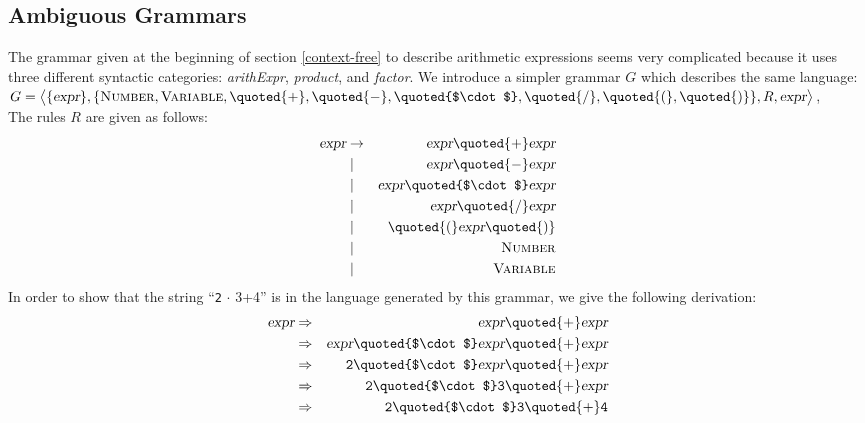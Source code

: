 \subsection{Ambiguous Grammars}
The grammar given at the beginning of section \ref{context-free} to describe arithmetic
expressions seems very complicated because it uses three different syntactic categories: \textsl{arithExpr},
\textsl{product}, and \textsl{factor}.  We introduce a simpler grammar $G$
which describes the same language:
\\[0.2cm]
\hspace*{1.3cm}
$G = \bigl\langle \{\textsl{expr}\}, \{ \textsc{Number}, \textsc{Variable}, \quoted{+}, \quoted{-}, \quoted{$\cdot$}, \quoted{/}, \quoted{(}, \quoted{)} \}, R, \textsl{expr} \bigr\rangle$,
\\[0.2cm]
The rules $R$ are given as follows:
\begin{eqnarray*}
  \textsl{expr} & \rightarrow & \textsl{expr} \quoted{+} \textsl{expr}  \\
                & \mid & \textsl{expr} \quoted{-} \textsl{expr}  \\
                & \mid & \textsl{expr} \quoted{$\cdot$} \textsl{expr}  \\
                & \mid & \textsl{expr} \quoted{/} \textsl{expr}  \\
                & \mid & \quoted{(} \textsl{expr} \quoted{)}     \\
                & \mid & \textsc{Number}                         \\
                & \mid & \textsc{Variable}                         
\end{eqnarray*}
In order to show that the string ``\texttt{2}$\,\cdot\,${3+4}'' is in the language generated by this grammar,
we give the following derivation:
\begin{eqnarray*}
\textsl{expr} & \Rightarrow & \textsl{expr} \quoted{+} \textsl{expr}                           \\
              & \Rightarrow & \textsl{expr} \quoted{$\cdot$} \textsl{expr} \quoted{+} \textsl{expr}  \\
              & \Rightarrow & \texttt{2} \quoted{$\cdot$} \textsl{expr} \quoted{+} \textsl{expr}     \\
              & \Rightarrow & \texttt{2} \quoted{$\cdot$} \texttt{3} \quoted{+} \textsl{expr}        \\
              & \Rightarrow & \texttt{2} \quoted{$\cdot$} \texttt{3} \quoted{+} \texttt{4}           
\end{eqnarray*}
